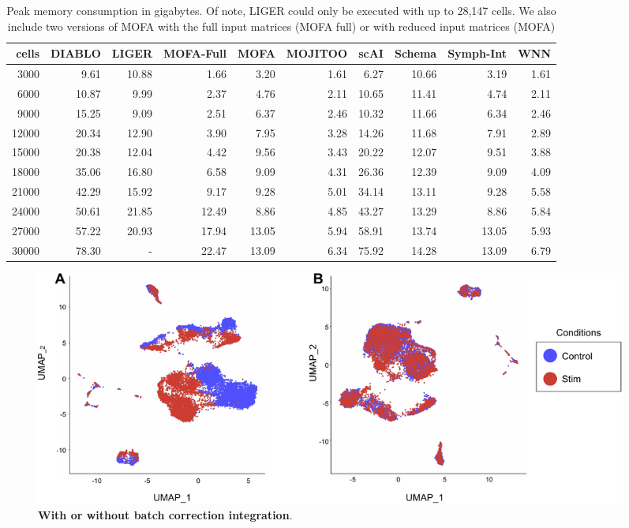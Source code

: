 \begin{table}[ht]
\centering
\caption[Peak Memory of MOJITOO]{Peak memory consumption in gigabytes. Of note, LIGER could only be executed with up to 28,147 cells. We also include  two versions of MOFA with the full input matrices (MOFA full) or with reduced input matrices (MOFA)}
\begin{tabular}{r|rrrrrrrrr}
  \hline
 cells & DIABLO & LIGER & MOFA-Full & MOFA & MOJITOO & scAI & Schema & Symph-Int & WNN \\ 
  \hline
3000 & 9.61 & 10.88 & 1.66 & 3.20 & 1.61 & 6.27 & 10.66 & 3.19 & 1.61 \\ 
  6000 & 10.87 & 9.99 & 2.37 & 4.76 & 2.11 & 10.65 & 11.41 & 4.74 & 2.11 \\ 
  9000 & 15.25 & 9.09 & 2.51 & 6.37 & 2.46 & 10.32 & 11.66 & 6.34 & 2.46 \\ 
  12000 & 20.34 & 12.90 & 3.90 & 7.95 & 3.28 & 14.26 & 11.68 & 7.91 & 2.89 \\ 
  15000 & 20.38 & 12.04 & 4.42 & 9.56 & 3.43 & 20.22 & 12.07 & 9.51 & 3.88 \\ 
  18000 & 35.06 & 16.80 & 6.58 & 9.09 & 4.31 & 26.36 & 12.39 & 9.09 & 4.09 \\ 
  21000 & 42.29 & 15.92 & 9.17 & 9.28 & 5.01 & 34.14 & 13.11 & 9.28 & 5.58 \\ 
  24000 & 50.61 & 21.85 & 12.49 & 8.86 & 4.85 & 43.27 & 13.29 & 8.86 & 5.84 \\ 
  27000 & 57.22 & 20.93 & 17.94 & 13.05 & 5.94 & 58.91 & 13.74 & 13.05 & 5.93 \\
  30000 & 78.30 & - & 22.47 & 13.09 & 6.34 & 75.92 & 14.28 & 13.09 & 6.79 \\ 
   \hline
\end{tabular}
\label{tab:memory}
\end{table}


\begin{figure}[!ht]
  \centering
  \includegraphics[width=0.95\textwidth]{batch_correction/fig}
  \vspace{0.1cm}
  \caption[With or without batch correction integration.]{\textbf{With or without batch correction integration}.}
  \label{fig:batch_correction}
\end{figure}

